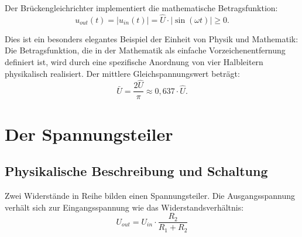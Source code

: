 ﻿\documentclass[12pt, a4paper]{article}
\begin{document}
	Der Brückengleichrichter implementiert die mathematische Betragsfunktion:
	\begin{equation}
		u_{out}(t) = \bigl|u_{in}(t)\bigr| = \hat{U} \cdot |\sin(\omega t)| \geq 0.
	\end{equation}
	
	Dies ist ein besonders elegantes Beispiel der Einheit von Physik und Mathematik: Die Betragsfunktion, die in der Mathematik als einfache Vorzeichenentfernung definiert ist, wird durch eine spezifische Anordnung von vier Halbleitern physikalisch realisiert. Der mittlere Gleichspannungswert beträgt:
	\begin{equation}
		\bar{U} = \frac{2\hat{U}}{\pi} \approx 0{,}637 \cdot \hat{U}.
	\end{equation}
	
	\section{Der Spannungsteiler}
	
	\subsection{Physikalische Beschreibung und Schaltung}
	
	Zwei Widerstände in Reihe bilden einen Spannungsteiler. Die Ausgangsspannung verhält sich zur Eingangsspannung wie das Widerstandsverhältnis:
	\begin{equation}
		U_{out} = U_{in} \cdot \frac{R_2}{R_1 + R_2}
	\end{equation}
	
\end{document}
